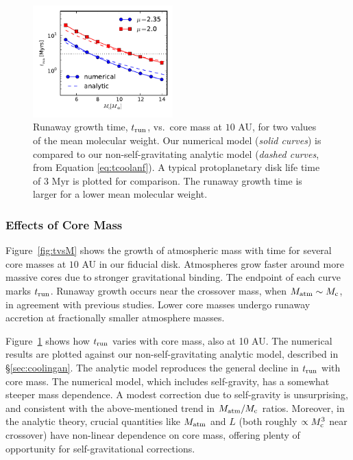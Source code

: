 \documentclass[apj, numberedappendix]{emulateapj}
\newcommand{\Fig}[1]{Figure~\ref{#1}}
\newcommand{\co}{_{\rm c}}
\begin{document}
\begin{figure}[htb]
\centering
\includegraphics[width=0.48\textwidth]{../../figs/ModelAtmospheres/RadSelfGravPoly/PaperFigs/coolingtime_vs_Mc_10au.pdf}
\caption{Runaway growth time, $t_{\rm{run}}$, vs.\ core mass at $10$ AU, for two values of the mean molecular weight.  Our numerical model (\emph{solid curves}) is compared to our non-self-gravitating analytic model (\emph{dashed curves}, from Equation \ref{eq:tcoolanf}).  A typical protoplanetary disk life time of $3$ Myr is plotted for comparison. The runaway growth time is larger for a lower mean molecular weight.}
\label{fig:tvsMcomp}
\end{figure}


\subsubsection{Effects of Core Mass}
\label{Mct}

\Fig{fig:tvsM} shows the growth of atmospheric mass with time for several core masses at $10$ AU in our fiducial disk.  Atmospheres grow faster around more massive cores due to stronger gravitational binding.  The endpoint of each curve marks $t_{\rm run}$.   Runaway growth occurs near the crossover mass, when $M_{\rm atm} \sim M\co$, in agreement with previous studies. Lower core masses undergo runaway accretion at fractionally smaller atmosphere masses. %

\Fig{fig:tvsMcomp} shows how $t_{\rm run}$ varies with core mass, also at 10 AU.  The numerical results are plotted against our non-self-gravitating analytic model, described in \S\ref{sec:coolingan}.  The analytic model reproduces the general decline in $t_{\rm run}$ with core mass.  The numerical model, which includes self-gravity, has a somewhat steeper mass dependence.  A modest correction due to self-gravity is unsurprising, and consistent with the above-mentioned trend in $M_{\rm atm}/M\co$ ratios.  Moreover, in the analytic theory, crucial quantities like $M_{\rm atm}$ and $L$ (both roughly $\propto M\co^3$ near crossover) have non-linear dependence on core mass, offering plenty of opportunity for self-gravitational corrections.
\end{document}
